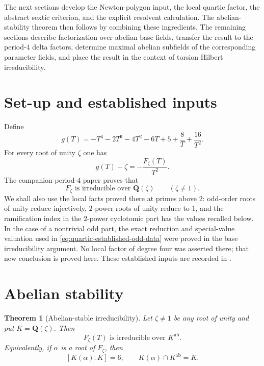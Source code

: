 \documentclass[11pt]{article}
\newtheorem{theorem}{Theorem}[section]
\newcommand{\Q}{\mathbf Q}
\begin{document}
The next sections develop the Newton-polygon input, the local quartic factor,
the abstract sextic criterion, and the explicit resolvent calculation.  The
abelian-stability theorem then follows by combining these ingredients.  The
remaining sections describe factorization over abelian base fields, transfer
the result to the period-$4$ delta factors, determine maximal abelian
subfields of the corresponding parameter fields, and place the result in the
context of torsion Hilbert irreducibility.

\section{Set-up and established inputs}

Define
\[
 g(T)=-T^4-2T^3-4T^2-6T+5+\frac8T+\frac{16}{T^2}.
\]
For every root of unity $\zeta$ one has
\begin{equation}\label{eq:draft-g-F}
 g(T)-\zeta=-\frac{F_\zeta(T)}{T^2}.
\end{equation}
The companion period-$4$ paper proves that
\begin{equation}\label{eq:established-base-irreducibility}
 F_\zeta\text{ is irreducible over }\Q(\zeta)
 \qquad(\zeta\ne1).
\end{equation}
We shall also use the local facts proved there at primes above
$2$: odd-order roots of unity reduce injectively, $2$-power roots of
unity reduce to $1$, and the ramification index in the $2$-power
cyclotomic part has the values recalled below.  In the case of a
nontrivial odd part, the exact reduction and special-value valuation
used in \eqref{eq:quartic-established-odd-data} were proved in the base
irreducibility argument.  No local factor of degree four was asserted
there; that new conclusion is proved here.  These established inputs are
recorded in \cite{WeiPeriod4}.





\section{Abelian stability}

\begin{theorem}[Abelian-stable irreducibility]
\label{thm:abelian-stability}
Let $\zeta\ne1$ be any root of unity and put $K=\Q(\zeta)$.  Then
\[
 F_\zeta(T)\text{ is irreducible over }K^{\mathrm{ab}}.
\]
Equivalently, if $\alpha$ is a root of $F_\zeta$, then
\[
 [K(\alpha):K]=6,
 \qquad
 K(\alpha)\cap K^{\mathrm{ab}}=K.
\]
\end{theorem}
\end{document}
